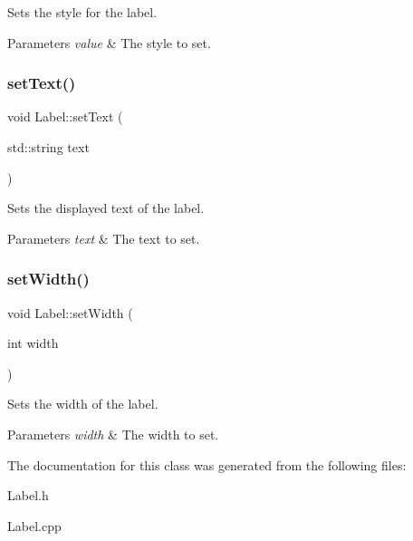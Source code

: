 Sets the style for the label. 


\begin{DoxyParams}{Parameters}
{\em value} & The style to set.\\
\hline
\end{DoxyParams}
\mbox{\label{class_label_a6bc9eefce325e64edb7d1aca939093fb}} 
\subsubsection{\texorpdfstring{setText()}{setText()}}
{\footnotesize\ttfamily void Label\+::set\+Text (\begin{DoxyParamCaption}\item[{std\+::string}]{text }\end{DoxyParamCaption})}



Sets the displayed text of the label. 


\begin{DoxyParams}{Parameters}
{\em text} & The text to set.\\
\hline
\end{DoxyParams}
\mbox{\label{class_label_a11354abcef74d29dca59ee029521d04b}} 
\subsubsection{\texorpdfstring{setWidth()}{setWidth()}}
{\footnotesize\ttfamily void Label\+::set\+Width (\begin{DoxyParamCaption}\item[{int}]{width }\end{DoxyParamCaption})}



Sets the width of the label. 


\begin{DoxyParams}{Parameters}
{\em width} & The width to set.\\
\hline
\end{DoxyParams}


The documentation for this class was generated from the following files\+:\begin{DoxyCompactItemize}
\item 
Label.\+h\item 
Label.\+cpp\end{DoxyCompactItemize}
